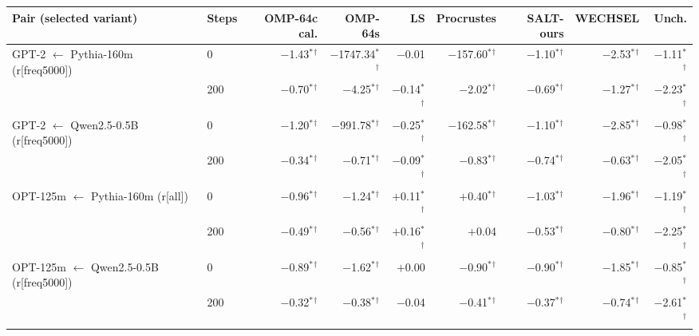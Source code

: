 \begin{tabular}{llrrrrrrr}
\toprule
Pair (selected variant) & Steps & OMP-64c cal. & OMP-64s & LS & Procrustes & SALT-ours & WECHSEL & Unch. \\
\midrule
GPT-2 $\leftarrow$ Pythia-160m (r[freq5000]) & 0 & $-$1.43$^{*}$$^{\dagger}$ & $-$1747.34$^{*}$$^{\dagger}$ & $-$0.01 & $-$157.60$^{*}$$^{\dagger}$ & $-$1.10$^{*}$$^{\dagger}$ & $-$2.53$^{*}$$^{\dagger}$ & $-$1.11$^{*}$$^{\dagger}$ \\
 & 200 & $-$0.70$^{*}$$^{\dagger}$ & $-$4.25$^{*}$$^{\dagger}$ & $-$0.14$^{*}$$^{\dagger}$ & $-$2.02$^{*}$$^{\dagger}$ & $-$0.69$^{*}$$^{\dagger}$ & $-$1.27$^{*}$$^{\dagger}$ & $-$2.23$^{*}$$^{\dagger}$ \\
\addlinespace
GPT-2 $\leftarrow$ Qwen2.5-0.5B (r[freq5000]) & 0 & $-$1.20$^{*}$$^{\dagger}$ & $-$991.78$^{*}$$^{\dagger}$ & $-$0.25$^{*}$$^{\dagger}$ & $-$162.58$^{*}$$^{\dagger}$ & $-$1.10$^{*}$$^{\dagger}$ & $-$2.85$^{*}$$^{\dagger}$ & $-$0.98$^{*}$$^{\dagger}$ \\
 & 200 & $-$0.34$^{*}$$^{\dagger}$ & $-$0.71$^{*}$$^{\dagger}$ & $-$0.09$^{*}$$^{\dagger}$ & $-$0.83$^{*}$$^{\dagger}$ & $-$0.74$^{*}$$^{\dagger}$ & $-$0.63$^{*}$$^{\dagger}$ & $-$2.05$^{*}$$^{\dagger}$ \\
\addlinespace
OPT-125m $\leftarrow$ Pythia-160m (r[all]) & 0 & $-$0.96$^{*}$$^{\dagger}$ & $-$1.24$^{*}$$^{\dagger}$ & $+$0.11$^{*}$$^{\dagger}$ & $+$0.40$^{*}$$^{\dagger}$ & $-$1.03$^{*}$$^{\dagger}$ & $-$1.96$^{*}$$^{\dagger}$ & $-$1.19$^{*}$$^{\dagger}$ \\
 & 200 & $-$0.49$^{*}$$^{\dagger}$ & $-$0.56$^{*}$$^{\dagger}$ & $+$0.16$^{*}$$^{\dagger}$ & $+$0.04 & $-$0.53$^{*}$$^{\dagger}$ & $-$0.80$^{*}$$^{\dagger}$ & $-$2.25$^{*}$$^{\dagger}$ \\
\addlinespace
OPT-125m $\leftarrow$ Qwen2.5-0.5B (r[freq5000]) & 0 & $-$0.89$^{*}$$^{\dagger}$ & $-$1.62$^{*}$$^{\dagger}$ & $+$0.00 & $-$0.90$^{*}$$^{\dagger}$ & $-$0.90$^{*}$$^{\dagger}$ & $-$1.85$^{*}$$^{\dagger}$ & $-$0.85$^{*}$$^{\dagger}$ \\
 & 200 & $-$0.32$^{*}$$^{\dagger}$ & $-$0.38$^{*}$$^{\dagger}$ & $-$0.04 & $-$0.41$^{*}$$^{\dagger}$ & $-$0.37$^{*}$$^{\dagger}$ & $-$0.74$^{*}$$^{\dagger}$ & $-$2.61$^{*}$$^{\dagger}$ \\
\bottomrule
\end{tabular}
